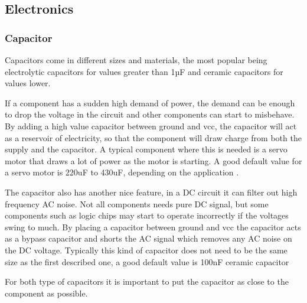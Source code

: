 \subsection{Electronics}
\subsubsection{Capacitor}
\label{sec:capacitor}
Capacitors come in different sizes and materials, the most popular being electrolytic capacitors for values greater than 1µF and ceramic capacitors for values lower. 

If a component has a sudden high demand of power, the demand can be enough to drop the voltage in the circuit and other components can start to misbehave. By adding a high value capacitor between ground and vcc, the capacitor will act as a reservoir of electricity, so that the component will draw charge from both the supply and the capacitor. A typical component where this is needed is a servo motor that draws a lot of power as the motor is starting. A good default value for a servo motor is 220uF to 430uF, depending on the application \cite{highcapacitor}.

The capacitor also has another nice feature, in a DC circuit it can filter out high frequency AC noise. Not all components needs pure DC signal, but some components such as logic chips may start to operate incorrectly if the voltages swing to much. By placing a capacitor between ground and vcc the capacitor acts as a bypass capacitor and shorts the AC signal which removes any AC noise on the DC voltage. Typically this kind of capacitor does not need to be the same size as the first described one, a good default value is 100nF ceramic capacitor \cite{lowcapacitor} 

For both type of capacitors it is important to put the capacitor as close to the component as possible.
